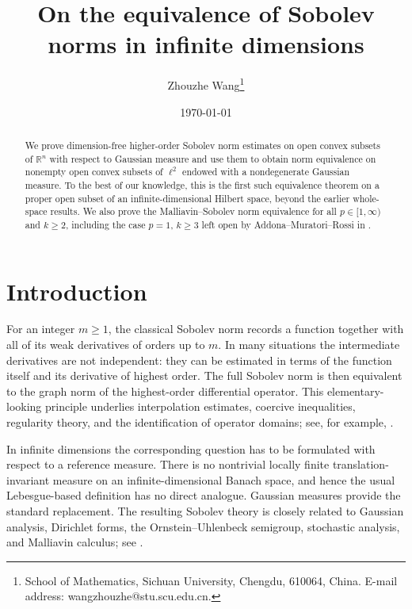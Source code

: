 \documentclass[12pt]{article}
\theoremstyle{plain}
\theoremstyle{definition}
\theoremstyle{remark}
\numberwithin{equation}{section}
\begin{document}
\title{On the equivalence of Sobolev norms in infinite dimensions}
\author{Zhouzhe Wang\footnote{School of Mathematics,
Sichuan University, Chengdu, 610064, China. E-mail address:
wangzhouzhe@stu.scu.edu.cn.}}
\date{\today}
\maketitle

\begin{abstract}
We prove dimension-free higher-order Sobolev norm estimates on open convex subsets of $\mathbb{R}^n$ with respect to Gaussian measure and use them to obtain norm equivalence on nonempty open convex subsets of $\ell^2$ endowed with a nondegenerate Gaussian measure. To the best of our knowledge, this is the first such equivalence theorem on a proper open subset of an infinite-dimensional Hilbert space, beyond the earlier whole-space results. We also prove the Malliavin--Sobolev norm equivalence for all $p\in[1,\infty)$ and $k\ge2$, including the case $p=1$, $k\ge3$ left open by Addona--Muratori--Rossi in \cite{AddonaMuratoriRossi}.




	
\end{abstract}

\tableofcontents

\section{Introduction}

For an integer $m\geqslant1$, the classical Sobolev norm records a function together with all of its weak derivatives of orders up to $m$.  In many situations the intermediate derivatives are not independent: they can be estimated in terms of the function itself and its derivative of highest order.  The full Sobolev norm is then equivalent to the graph norm of the highest-order differential operator.  This elementary-looking principle underlies interpolation estimates, coercive inequalities, regularity theory, and the identification of operator domains; see, for example, \cite{AdamsFournier}.

In infinite dimensions the corresponding question has to be formulated with respect to a reference measure.  There is no nontrivial locally finite translation-invariant measure on an infinite-dimensional Banach space, and hence the usual Lebesgue-based definition has no direct analogue.  Gaussian measures provide the standard replacement.  The resulting Sobolev theory is closely related to Gaussian analysis, Dirichlet forms, the Ornstein--Uhlenbeck semigroup, stochastic analysis, and Malliavin calculus; see \cite{BogachevGaussian,BogachevSurvey,DP,Nualart2006,ShigekawaBook,Ustunel1995}.
\end{document}
